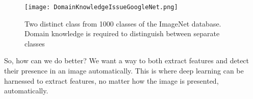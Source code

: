  \begin{figure}[H]
 	\centering
 	\texttt{[image: DomainKnowledgeIssueGoogleNet.png]}
 	\caption{Two distinct class from 1000 classes of the ImageNet database. Domain knowledge is required to distinguish between separate classes}
 	\label{fig:FeatureExtractionIssue}
 \end{figure}
 

 So, how can we do better? We want a way to both extract features and detect their presence in an image automatically. This is where deep learning can be harnessed to extract features, no matter how the image is presented, automatically.